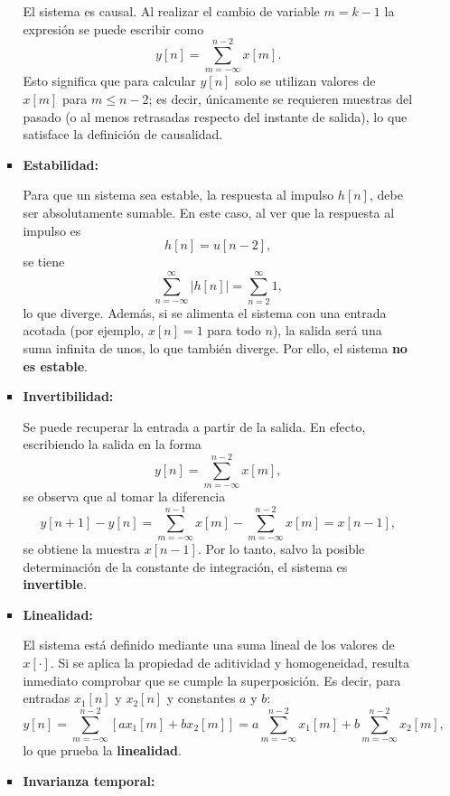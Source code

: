 \begin{enumerate}[label=\color{red}\textbf{\arabic*)}]
\begin{enumerate}[label=\color{red}\textbf{\alph*)}]
\begin{itemize}[label=\textbullet]
            El sistema es causal. Al realizar el cambio de variable $m=k-1$ la expresión se puede escribir como  \[
                y[n]=\sum_{m=-\infty}^{n-2} x[m].
            \] 
            Esto significa que para calcular $y[n]$ solo se utilizan valores de  $x[m]$ para  $m\le n-2$; es decir, únicamente se requieren muestras del pasado (o al menos retrasadas respecto del instante de salida), lo que satisface la definición de causalidad.
        \item \textbf{Estabilidad:}

            Para que un sistema sea estable, la respuesta al impulso $h[n]$, debe ser absolutamente sumable. En este caso, al ver que la respuesta al impulso es  \[
                h[n]=u[n-2],
            \] se tiene \[
            \sum_{n=-\infty}^{\infty} |h[n]|=\sum_{n=2}^{\infty} 1,
            \] 
            lo que diverge. Además, si se alimenta el sistema con una entrada acotada (por ejemplo, $x[n]=1$ para todo  $n$), la salida será una suma infinita de unos, lo que también diverge. Por ello, el sistema \textbf{no es estable}.

        \item \textbf{Invertibilidad:}

            Se puede recuperar la entrada a partir de la salida. En efecto, escribiendo la salida en la forma \[
                y[n]=\sum_{m=-\infty}^{n-2} x[m],
            \] 
            se observa que al tomar la diferencia \[
                y[n+1]-y[n]=\sum_{m=-\infty}^{n-1}x[m]-\sum_{m=-\infty}^{n-2} x[m]=x[n-1],
            \] se obtiene la muestra $x[n-1]$. Por lo tanto, salvo la posible determinación de la constante de integración, el sistema es  \textbf{invertible}.
        \item \textbf{Linealidad:}

            El sistema está definido mediante una suma lineal de los valores de $x[\cdot ]$. Si se aplica la propiedad de aditividad y homogeneidad, resulta inmediato comprobar que se cumple la superposición. Es decir, para entradas $x_1[n]$ y $x_2[n]$ y constantes $a$ y  $b$:  \[
                y[n]=\sum_{m=-\infty}^{n-2} \left[ ax_1[m]+bx_2[m] \right] =a \sum_{m=-\infty}^{n-2}x_1[m]+b \sum_{m=-\infty}^{n-2} x_2[m], 
            \] lo que prueba la \textbf{linealidad}. 
        \item \textbf{Invarianza temporal:}


\end{itemize}
\end{enumerate}
\end{enumerate}
